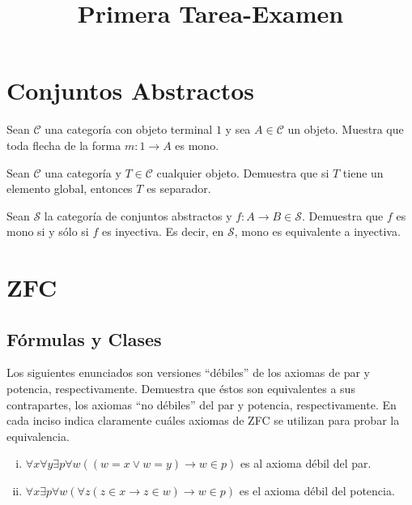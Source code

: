 \documentclass[10pt]{article}
\title{Primera Tarea-Examen}
\author{}
\date{}
\newcommand{\topos}[1]{\mathcal{#1}}
\begin{document}
    \maketitle

    \section*{Conjuntos Abstractos}
    
    \begin{exercise}
        Sean \(\topos{C}\) una categoría con objeto terminal $1$ y sea \(A \in \topos{C}\) un objeto. Muestra que toda flecha de la forma \(m:1\to A\) es mono.
    \end{exercise}

    \begin{exercise}
        Sean \(\topos{C}\) una categoría y \(T \in \topos{C}\) cualquier objeto. Demuestra que si \(T\) tiene un elemento global, entonces \(T\) es separador.
    \end{exercise}

    \begin{exercise}
        Sean \(\topos{S}\) la categoría de conjuntos abstractos y \(f\colon A\to B \in \topos{S}\). Demuestra que $f$ es mono si y sólo si $f$ es inyectiva. Es decir, en \(\topos{S}\), mono es equivalente a inyectiva. 
    \end{exercise}


    \newpage

    \section*{ZFC}
    \subsection*{Fórmulas y Clases}

    \begin{exercise}
        Los siguientes enunciados son versiones ``débiles'' de los axiomas de par y potencia, respectivamente. Demuestra que éstos son equivalentes a sus contrapartes, los axiomas ``no débiles'' del par y potencia, respectivamente. En cada inciso indica claramente cuáles axiomas de ZFC se utilizan para probar la equivalencia.
        \begin{enumerate}[i)]
            \item \(\forall x \forall y \exists p \forall w ( (w=x \lor w=y) \to w \in p ) \) es al axioma débil del par.
            \item \(\forall x \exists p \forall w ( \forall z ( z \in x \to z \in w) \rightarrow w \in p )\) es el axioma débil del potencia.
        \end{enumerate}
    \end{exercise}
\end{document}
